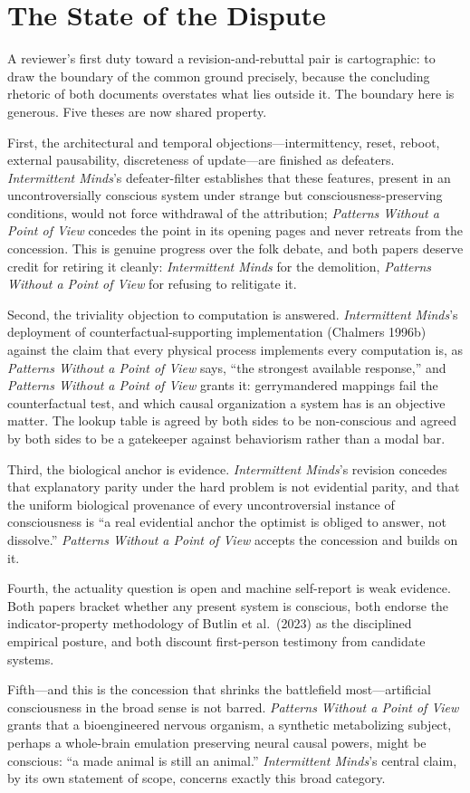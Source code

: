 \documentclass[11pt]{article}
\newcommand{\IM}{\emph{Intermittent Minds}}
\newcommand{\PP}{\emph{Patterns Without a Point of View}}
\begin{document}
\section{The State of the Dispute}

A reviewer's first duty toward a revision-and-rebuttal pair is cartographic: to draw the boundary of the common ground precisely, because the concluding rhetoric of both documents overstates what lies outside it. The boundary here is generous. Five theses are now shared property.

First, the architectural and temporal objections---intermittency, reset, reboot, external pausability, discreteness of update---are finished as defeaters. \IM{}'s defeater-filter establishes that these features, present in an uncontroversially conscious system under strange but consciousness-preserving conditions, would not force withdrawal of the attribution; \PP{} concedes the point in its opening pages and never retreats from the concession. This is genuine progress over the folk debate, and both papers deserve credit for retiring it cleanly: \IM{} for the demolition, \PP{} for refusing to relitigate it.

Second, the triviality objection to computation is answered. \IM{}'s deployment of counterfactual-supporting implementation (Chalmers 1996b) against the claim that every physical process implements every computation is, as \PP{} says, ``the strongest available response,'' and \PP{} grants it: gerrymandered mappings fail the counterfactual test, and which causal organization a system has is an objective matter. The lookup table is agreed by both sides to be non-conscious and agreed by both sides to be a gatekeeper against behaviorism rather than a modal bar.

Third, the biological anchor is evidence. \IM{}'s revision concedes that explanatory parity under the hard problem is not evidential parity, and that the uniform biological provenance of every uncontroversial instance of consciousness is ``a real evidential anchor the optimist is obliged to answer, not dissolve.'' \PP{} accepts the concession and builds on it.

Fourth, the actuality question is open and machine self-report is weak evidence. Both papers bracket whether any present system is conscious, both endorse the indicator-property methodology of Butlin et al.\ (2023) as the disciplined empirical posture, and both discount first-person testimony from candidate systems.

Fifth---and this is the concession that shrinks the battlefield most---artificial consciousness in the broad sense is not barred. \PP{} grants that a bioengineered nervous organism, a synthetic metabolizing subject, perhaps a whole-brain emulation preserving neural causal powers, might be conscious: ``a made animal is still an animal.'' \IM{}'s central claim, by its own statement of scope, concerns exactly this broad category.
\end{document}
